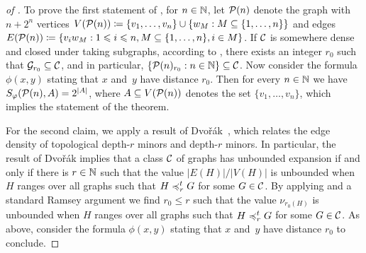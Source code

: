 \begin{proof}[of ]
To prove the first statement of , 
for $n\in \mathbb{N}$, let $\mathcal{P}(n)$ denote the graph with $n+2^n$ 
vertices $V(\mathcal{P}(n))\coloneqq \{v_1,\ldots, v_n\}\cup \{w_M : M\subseteq \{1,\ldots, n\}\}$ and edges $E(\mathcal{P}(n))\coloneqq \{v_iw_M :1\leqslant i\leqslant n, M\subseteq \{1,\ldots, n\}, i\in M\}$. 
If $\mathcal{C}$ is somewhere dense and closed under taking subgraphs, 
according to , there exists an integer $r_0$ 
such that $\mathcal{G}_{r_0}\subseteq \mathcal{C}$, and in particular, 
$\{\mathcal{P}(n)_{r_0} :n\in \mathbb{N}\}\subseteq \mathcal{C}$. Now consider 
the formula $\phi(x,y)$ stating that $x$ and~$y$ have 
distance $r_0$. Then for every $n\in \mathbb{N}$ we have 
$S_\varphi(\mathcal{P}(n),A)=2^{|A|}$, where $A\subseteq V(\mathcal{P}(n))$ denotes the set $\{v_1,\ldots, v_n\}$, which implies the statement
of the theorem.

For the second claim, we apply a result of Dvo\v{r}\'ak~\cite{s}, 
which relates the edge density of topological depth-$r$ minors
and depth-$r$ minors. In particular, the result of Dvo\v{r}\'ak
implies that a 
class $\mathcal{C}$ of graphs has unbounded expansion if and only 
if there is $r\in \mathbb{N}$ such that the value $|E(H)|/|V(H)|$ is unbounded
when $H$ ranges over all graphs such that $H\preccurlyeq_r^tG $ for some $G\in \mathcal{C}$.
 By applying  and 
a standard Ramsey argument we find $r_0\leq r$ such that the value
$\nu_{r_0(H)}$ is unbounded when $H$ ranges over all graphs such that $H\preccurlyeq_r^t G$
for some $G\in\mathcal{C}$. As above, consider 
the formula $\phi(x,y)$ stating that $x$ and~$y$ have 
distance $r_0$ to conclude. 
\end{proof}

